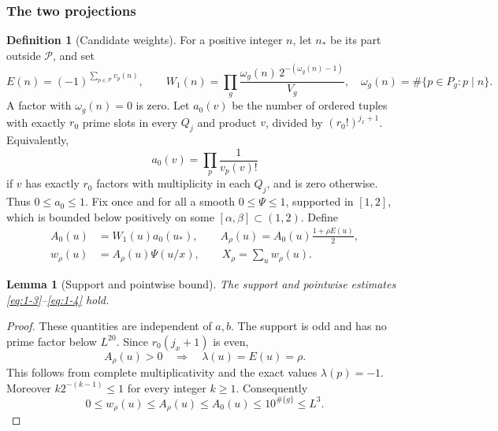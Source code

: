 \documentclass[11pt]{article}
\newtheorem{lemma}[theorem]{Lemma}
\theoremstyle{definition}
\newtheorem{definition}[theorem]{Definition}
\theoremstyle{definition}
\begin{document}
\subsubsection{The two projections}\label{sec:projections}
\begin{definition}[Candidate weights]\label{def:weights}
For a positive integer \(n\), let \(n_*\) be its part outside \(\mathcal P\), and set
\begin{equation*}
E(n)=(-1)^{\sum_{p\in\mathcal P}v_p(n)},\qquad
 W_1(n)=\prod_g\frac{\omega_g(n)\,2^{-(\omega_g(n)-1)}}{V_g},
 \quad \omega_g(n)=\#\{p\in P_g:p\mid n\}.
\end{equation*}
A factor with \(\omega_g(n)=0\) is zero. Let \(a_0(v)\) be the number of ordered tuples with exactly \(r_0\) prime slots in every \(Q_j\) and product \(v\), divided by \((r_0!)^{j_x+1}\). Equivalently,
\begin{equation*}
a_0(v)=\prod_p\frac1{v_p(v)!}
\end{equation*}
if \(v\) has exactly \(r_0\) factors with multiplicity in each \(Q_j\), and is zero otherwise. Thus \(0\le a_0\le1\). Fix once and for all a smooth \(0\le\Psi\le1\), supported in \([1,2]\), which is bounded below positively on some \([\alpha,\beta]\subset(1,2)\). Define
\begin{equation}
\begin{aligned}
A_0(u)&=W_1(u)a_0(u_*),\qquad
 A_\rho(u)=A_0(u)\frac{1+\rho E(u)}2,\\
 w_\rho(u)&=A_\rho(u)\Psi(u/x),\qquad
 X_\rho=\sum_uw_\rho(u).
\end{aligned}                                \tag{1.2}\label{eq:1-2}
\end{equation}
\end{definition}
\begin{lemma}[Support and pointwise bound]\label{lem:support}
The support and pointwise estimates \eqref{eq:1-3}--\eqref{eq:1-4} hold.
\end{lemma}
\begin{proof}
These quantities are independent of \(a,b\). The support is odd and has no prime factor below \(L^{20}\). Since \(r_0(j_x+1)\) is even,
\begin{equation}
A_\rho(u)>0\quad\Longrightarrow\quad\lambda(u)=E(u)=\rho.
                                                        \tag{1.3}\label{eq:1-3}
\end{equation}
This follows from complete multiplicativity and the exact values \(\lambda(p)=-1\). Moreover
\(k2^{-(k-1)}\le1\) for every integer \(k\ge1\). Consequently
\begin{equation}
0\le w_\rho(u)\le A_\rho(u)\le A_0(u)
 \le 10^{\#\{g\}}\le L^3.                               \tag{1.4}\label{eq:1-4}
\end{equation}

\end{proof}
\end{document}

